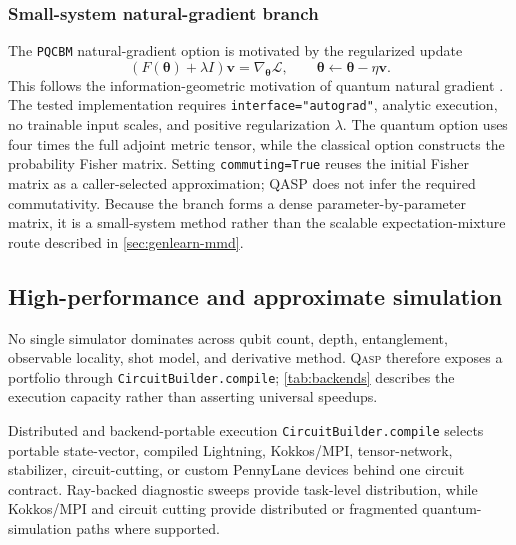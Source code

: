 \documentclass[10pt]{article}
\newcommand{\qasp}{\textsc{Qasp}}
\newcommand{\code}[1]{\texttt{#1}}
\begin{document}
\subsubsection{Small-system natural-gradient branch}

The \code{PQCBM} natural-gradient option is motivated by the
regularized update
\begin{equation}
  \left(F(\bm{\theta})+\lambda I\right)\bm{v}
  =\nabla_{\bm{\theta}}\mathcal{L},
  \qquad
  \bm{\theta}\leftarrow\bm{\theta}-\eta\bm{v}.
  \label{eq:naturalgradient}
\end{equation}
This follows the information-geometric motivation of quantum natural gradient
\cite{stokes2020qng}.  The tested implementation requires
\code{interface="autograd"}, analytic execution, no trainable input scales,
and positive regularization $\lambda$.  The quantum option uses four times the
full adjoint metric tensor, while the classical option constructs the
probability Fisher matrix.  Setting \code{commuting=True} reuses the initial
Fisher matrix as a caller-selected approximation; QASP does not infer the
required commutativity.  Because the branch forms a dense
parameter-by-parameter matrix, it is a small-system method rather than the
scalable expectation-mixture route described in
\cref{sec:genlearn-mmd}.

\subsection{High-performance and approximate simulation}
\label{sec:simulation}

No single simulator dominates across qubit count, depth, entanglement, observable locality, shot model, and derivative method.  \qasp{} therefore exposes a portfolio through \code{CircuitBuilder.compile}; \cref{tab:backends} describes the execution capacity rather than asserting universal speedups.

\begin{qaspfeature}{Distributed and backend-portable execution}
\code{CircuitBuilder.compile} selects portable state-vector, compiled
Lightning, Kokkos/MPI, tensor-network, stabilizer, circuit-cutting, or custom
PennyLane devices behind one circuit contract.  Ray-backed diagnostic sweeps
provide task-level distribution, while Kokkos/MPI and circuit cutting provide
distributed or fragmented quantum-simulation paths where supported.
\end{qaspfeature}
\end{document}
